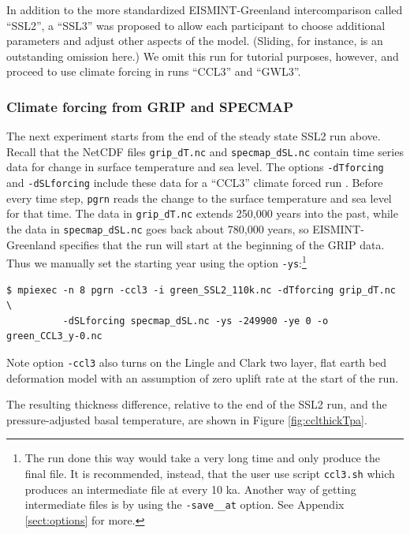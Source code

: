 \documentclass[11pt,final]{amsart}
\newcommand{\und}{\_\!\_}
\newcommand{\pismoptionindex}[1]{\index{options for PISM (and PETSc)!\texttt{-#1}}}
\newcommand{\intextoption}[1]{\texttt{-#1}\pismoptionindex{#1}}
\begin{document}
In addition to the more standardized EISMINT-Greenland intercomparison called ``SSL2'', a ``SSL3'' was proposed to allow each participant to choose additional parameters and adjust other aspects of the model.  (Sliding, for instance, is an outstanding omission here.)  We omit this run for tutorial purposes, however, and proceed to use climate forcing in runs ``CCL3'' and ``GWL3''.


\subsubsection*{Climate forcing from GRIP and SPECMAP} 
\label{sec:climate-forcing}
The next experiment starts from the end of the steady state SSL2 run above.  Recall that the NetCDF files \verb|grip_dT.nc| and \verb|specmap_dSL.nc| contain time series data for change in surface temperature and sea level.  The options \verb|-dTforcing| and \verb|-dSLforcing| include these data for a ``CCL3'' climate forced run \cite{RitzEISMINT,HuybrechtsEISMINT}.  Before every time step, \verb|pgrn| reads the change to the surface temperature and sea level for that time.  The data in \verb|grip_dT.nc| extends 250,000 years into the past, while the data in \verb|specmap_dSL.nc| goes back about 780,000 years, so EISMINT-Greenland specifies that the run will start at the beginning of the GRIP data.  Thus we manually set the starting year using the option \verb|-ys|:\footnote{The run done this way would take a very long time and only produce the final file.  It is recommended, instead, that the user use script \texttt{ccl3.sh} which produces an intermediate file at every 10 ka. Another way of getting intermediate files is by using the \intextoption{save\und at} option. See Appendix \ref{sect:options} for more.}

\begin{verbatim}
$ mpiexec -n 8 pgrn -ccl3 -i green_SSL2_110k.nc -dTforcing grip_dT.nc \
          -dSLforcing specmap_dSL.nc -ys -249900 -ye 0 -o green_CCL3_y-0.nc
\end{verbatim}
\noindent Note option \verb|-ccl3| also turns on the Lingle and Clark \cite{BLKfastearth,LingleClark} two layer, flat earth bed deformation model with an assumption of zero uplift rate at the start of the run.

The resulting thickness difference, relative to the end of the SSL2 run, and the pressure-adjusted basal temperature, are shown in Figure \ref{fig:cclthickTpa}.
\end{document}
